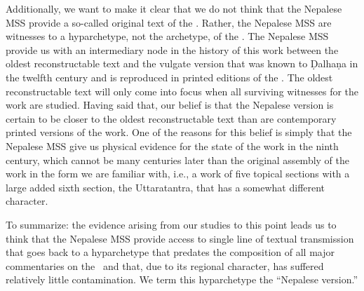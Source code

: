 Additionally, we want to make it clear that we do not think that the Nepalese MSS
provide a so-called original text of the \SS.  Rather, the Nepalese MSS are
witnesses to a hyparchetype, not the archetype, of the \SS.  The Nepalese MSS
provide us with an intermediary node in the history of this work between the
oldest reconstructable text and the vulgate version that was known to Ḍalhaṇa in
the twelfth century and is reproduced in printed editions of the \SS.  The oldest
reconstructable text will only come into focus when all surviving witnesses for
the work are studied.  Having said that, our belief is that the Nepalese version
is certain to be closer to the oldest reconstructable text than are contemporary
printed versions of the work. One of the reasons for this belief is simply that
the Nepalese MSS give us physical evidence for the state of the work in the ninth
century, which cannot be many centuries later than the original assembly of the
work in the form we are familiar with, i.e., a work of five topical sections with
a large added sixth section, the Uttaratantra, that has a somewhat different
character. 

%
%

To summarize: the evidence arising from our studies to this point leads us to think that the
Nepalese MSS provide access to single line of textual transmission that goes back
to a hyparchetype that predates the composition of all major commentaries on the
\SS\ and that, due to its regional character, has suffered relatively little
contamination. We term this hyparchetype the “Nepalese version.” 



